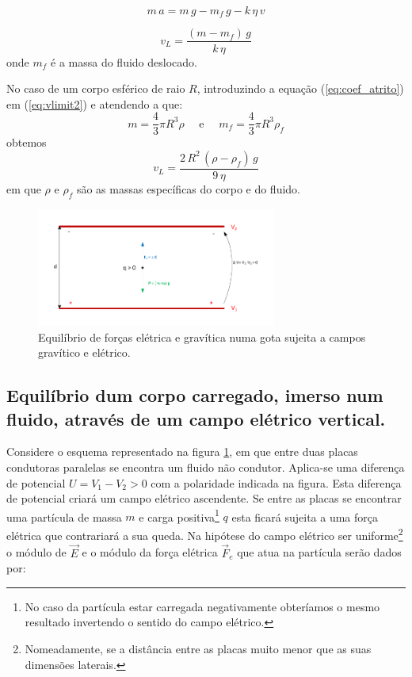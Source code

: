 \documentclass[a4paper,twoside,12pt]{article}      %
\begin{document}
\begin{equation}
	\label{eq:mov2}
	m\,a = m\,g - m_f\,g  - k  \, \eta \, v
\end{equation}


\begin{equation}
	\label{eq:vlimit2}
	v_L = \frac{(m - m_f)\,g}{k  \, \eta}
\end{equation}
onde $m_f$ é a massa do fluido deslocado.

No caso de um corpo esférico de raio $R$, introduzindo a equação (\ref{eq:coef_atrito}) em (\ref{eq:vlimit2}) e atendendo a que:
\begin{equation*}
	m = \frac{4}{3} \pi R^3 \rho \quad \textrm{  e } \quad  m_f = \frac{4}{3} \pi R^3 \rho_f
\end{equation*}
obtemos
\begin{equation}
	\label{eq:vlimit3}
	v_L = \frac{2\,R^2\, (\rho - \rho_f)\,g}{9  \, \eta}
\end{equation}
em que $\rho$  e $\rho_f$ são as massas específicas do corpo e do fluido.

%


\begin{figure}
	[tb]  \centering 
	\includegraphics[width=0.7\textwidth]{./F_equil}
	\caption{Equilíbrio de forças elétrica e gravítica numa gota sujeita a campos gravítico e elétrico. \label{fig:f_equil}} 
\end{figure}


\subsection{\sf Equilíbrio dum corpo carregado, imerso num fluido, através de um campo elétrico vertical.}

Considere o esquema representado na figura \ref{fig:f_equil}, em que entre duas placas condutoras paralelas se encontra um fluido não condutor. Aplica-se uma diferença de potencial \mbox{$U = V_1 -V_2 > 0$} com a polaridade indicada na figura. Esta diferença de potencial criará um campo elétrico ascendente. Se entre as placas se encontrar uma partícula de massa $m$ e carga positiva\footnote{No caso da partícula estar carregada negativamente obteríamos o mesmo resultado invertendo o sentido do campo elétrico.} $q$  esta ficará sujeita a uma força elétrica que contrariará a sua queda.
Na hipótese do campo elétrico ser uniforme\footnote{Nomeadamente, se a distância entre as placas muito menor que as suas dimensões laterais.} o módulo de $\vec{E}$ e o módulo da força elétrica $\vec{F}_e$ que atua na partícula serão dados por:
\end{document}
